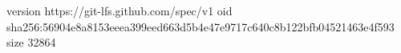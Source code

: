 version https://git-lfs.github.com/spec/v1
oid sha256:56904e8a8153eeea399eed663d5b4e47e9717c640c8b122bfb04521463e4f593
size 32864
